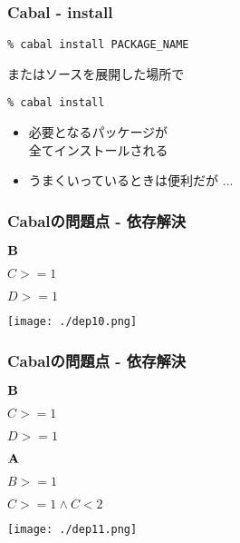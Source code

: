 \documentclass[cjk,dvipdfm,14pt]{beamer}
\begin{document}
\begin{frame}[fragile]
\frametitle{Cabal - install}

\lstset{language=bash,basicstyle=\ttfamily}

\begin{lstlisting}
% cabal install PACKAGE_NAME
\end{lstlisting}

またはソースを展開した場所で

\begin{lstlisting}
% cabal install
\end{lstlisting}

\begin{itemize}
\item 必要となるパッケージが\\全てインストールされる
\item うまくいっているときは便利だが ...
\end{itemize}

\end{frame}

\begin{frame}
\frametitle{Cabalの問題点 - 依存解決}

\begin{description}
\item ${\bf B}$
\item
  \begin{description}
  \item $C >= 1$
  \item $D >= 1$
  \end{description}
\end{description}

\texttt{[image: ./dep10.png]}
\end{frame}

\begin{frame}
\frametitle{Cabalの問題点 - 依存解決}

\begin{description}
\item ${\bf B}$
\item
  \begin{description}
  \item $C >= 1$
  \item $D >= 1$
  \end{description}
\end{description}

\begin{description}
\item ${\bf A}$
\item
  \begin{description}
  \item $B >= 1$
  \item $C >= 1 \wedge C < 2$
  \end{description}
\end{description}

\texttt{[image: ./dep11.png]}
\end{frame}
\end{document}

